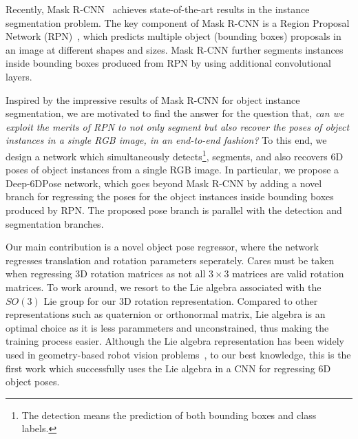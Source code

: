 \documentclass[conference]{IEEEtran}
\newcommand{\method}[1]{Deep-6DPose}
\begin{document}
Recently, Mask R-CNN~\cite{Mask-RCNN} achieves state-of-the-art results in the instance segmentation problem. The key component of Mask R-CNN is a Region Proposal Network (RPN)~\cite{Faster-RCNN}, which predicts multiple object (bounding boxes) proposals in an image at different shapes and sizes. 
Mask R-CNN further segments instances inside bounding boxes produced from RPN by using additional convolutional layers. 

Inspired by the impressive results of Mask R-CNN for object instance segmentation, 
we are motivated to find the answer for the question that, \textit{can we exploit the merits of RPN to not only segment but also recover the poses of object instances in a single RGB image, in an end-to-end fashion?}
To this end, we design a network which simultaneously detects\footnote{The detection means the prediction of both bounding boxes and class labels.}, segments, and also recovers 6D poses of object instances from a single RGB image. In particular, we propose a \method{} network, which goes beyond Mask R-CNN by adding a novel branch for regressing the poses for the object instances inside bounding boxes produced by RPN. The proposed pose branch is parallel with the detection and segmentation branches. 

Our main contribution is a novel object pose regressor, where the network regresses translation and rotation parameters seperately. Cares must be taken when regressing 3D rotation matrices as not all $3\times3$ matrices are valid rotation matrices. To work around, we resort to the Lie algebra associated with the $SO(3)$ Lie group for our 3D rotation representation. Compared to other representations such as quaternion or orthonormal matrix, Lie algebra is an optimal choice as it is less parammeters and unconstrained, thus making the training process easier. Although the Lie algebra representation has been widely used in geometry-based robot vision problems~\cite{DBLP:conf/iros/Agrawal06,DBLP:conf/icra/RosGSPL13}, to our best knowledge, this is the first work which successfully uses the Lie algebra in a CNN for regressing 6D object poses.

\end{document}
